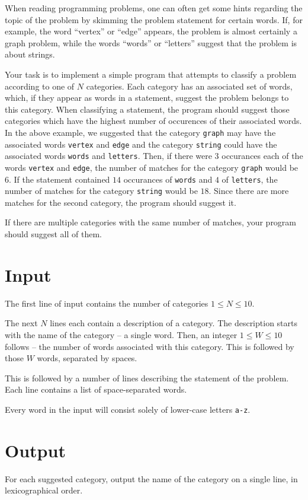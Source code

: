 When reading programming problems, one can often get some hints regarding the topic of the problem by skimming the problem statement for certain words.
If, for example, the word ``vertex'' or ``edge'' appears, the problem is almost certainly a graph problem, while the words ``words'' or ``letters'' suggest that the problem is about strings.

Your task is to implement a simple program that attempts to classify a problem according to one of $N$ categories.
Each category has an associated set of words, which, if they appear as words in a statement, suggest the problem belongs to this category.
When classifying a statement, the program should suggest those categories which have the highest number of occurences of their associated words.
In the above example, we suggested that the category \texttt{graph} may have the associated words \texttt{vertex} and \texttt{edge} and the category \texttt{string} could have the associated words \texttt{words} and \texttt{letters}.
Then, if there were $3$ occurances each of the words \texttt{vertex} and \texttt{edge}, the number of matches for the category \texttt{graph} would be $6$.
If the statement contained $14$ occurances of \texttt{words} and $4$ of \texttt{letters}, the number of matches for the category \texttt{string} would be $18$.
Since there are more matches for the second category, the program should suggest it.

If there are multiple categories with the same number of matches, your program should suggest all of them.

\section*{Input}
The first line of input contains the number of categories $1 \le N \le 10$.

The next $N$ lines each contain a description of a category.
The description starts with the name of the category -- a single word.
Then, an integer $1 \le W \le 10$ follows -- the number of words associated with this category.
This is followed by those $W$ words, separated by spaces.

This is followed by a number of lines describing the statement of the problem.
Each line contains a list of space-separated words.

Every word in the input will consist solely of lower-case letters \texttt{a-z}.

\section*{Output}
For each suggested category, output the name of the category on a single line, in lexicographical order.
